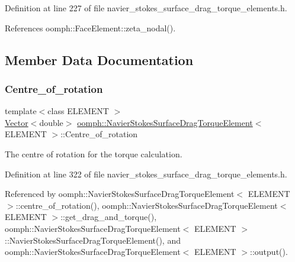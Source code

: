 Definition at line 227 of file navier\+\_\+stokes\+\_\+surface\+\_\+drag\+\_\+torque\+\_\+elements.\+h.



References oomph\+::\+Face\+Element\+::zeta\+\_\+nodal().



\subsection{Member Data Documentation}
\mbox{\label{classoomph_1_1NavierStokesSurfaceDragTorqueElement_a259b32d562083695f6d187e1ec997a69}} 
\subsubsection{\texorpdfstring{Centre\+\_\+of\+\_\+rotation}{Centre\_of\_rotation}}
{\footnotesize\ttfamily template$<$class E\+L\+E\+M\+E\+NT $>$ \\
\hyperlink{classoomph_1_1Vector}{Vector}$<$double$>$ \hyperlink{classoomph_1_1NavierStokesSurfaceDragTorqueElement}{oomph\+::\+Navier\+Stokes\+Surface\+Drag\+Torque\+Element}$<$ E\+L\+E\+M\+E\+NT $>$\+::Centre\+\_\+of\+\_\+rotation\hspace{0.3cm}{\ttfamily [private]}}



The centre of rotation for the torque calculation. 



Definition at line 322 of file navier\+\_\+stokes\+\_\+surface\+\_\+drag\+\_\+torque\+\_\+elements.\+h.



Referenced by oomph\+::\+Navier\+Stokes\+Surface\+Drag\+Torque\+Element$<$ E\+L\+E\+M\+E\+N\+T $>$\+::centre\+\_\+of\+\_\+rotation(), oomph\+::\+Navier\+Stokes\+Surface\+Drag\+Torque\+Element$<$ E\+L\+E\+M\+E\+N\+T $>$\+::get\+\_\+drag\+\_\+and\+\_\+torque(), oomph\+::\+Navier\+Stokes\+Surface\+Drag\+Torque\+Element$<$ E\+L\+E\+M\+E\+N\+T $>$\+::\+Navier\+Stokes\+Surface\+Drag\+Torque\+Element(), and oomph\+::\+Navier\+Stokes\+Surface\+Drag\+Torque\+Element$<$ E\+L\+E\+M\+E\+N\+T $>$\+::output().

